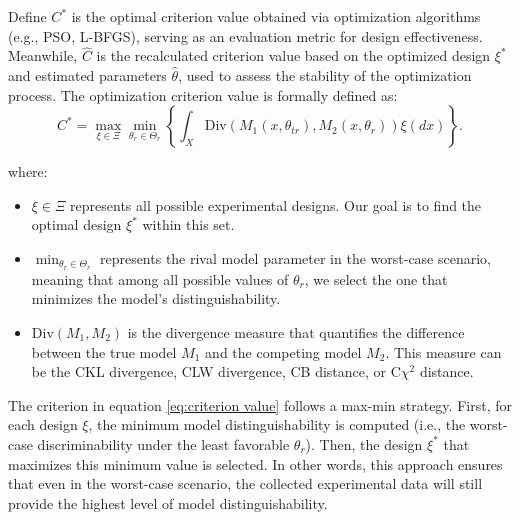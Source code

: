 \hspace*{8mm} Define $C^*$ is the optimal criterion value obtained via optimization algorithms (e.g., PSO, L-BFGS), serving as an evaluation metric for design effectiveness. Meanwhile, $\hat{C}$ is the recalculated criterion value based on the optimized design $\xi^*$ and estimated parameters $\hat{\theta}$, used to assess the stability of the optimization process. The optimization criterion value is formally defined as:
\begin{equation}\label{eq:criterion value}
C^* = \max_{\xi \in \Xi} \min_{\theta_r \in \Theta_r} \left\{ \int_X \text{Div} \left( M_1(x, \theta_{tr}), M_2(x, \theta_r) \right) \xi(dx) \right\}.
\end{equation}

where:  
\begin{itemize}
\item $\xi \in \Xi$ represents all possible experimental designs. Our goal is to find the optimal design $\xi^*$ within this set.

\item $\min_{\theta_r \in \Theta_r}$ represents the rival model parameter in the worst-case scenario, meaning that among all possible values of $\theta_r$, we select the one that minimizes the model's distinguishability.

\item $\text{Div}(M_1, M_2)$ is the divergence measure that quantifies the difference between the true model $M_1$ and the competing model $M_2$. This measure can be the CKL divergence, CLW divergence, CB distance, or C$\chi^2$ distance. 

\end{itemize}

\hspace*{8mm} The criterion in equation \eqref{eq:criterion value} follows a max-min strategy. First, for each design $\xi$, the minimum model distinguishability is computed (i.e., the worst-case discriminability under the least favorable $\theta_r$). Then, the design $\xi^*$ that maximizes this minimum value is selected. In other words, this approach ensures that even in the worst-case scenario, the collected experimental data will still provide the highest level of model distinguishability.

